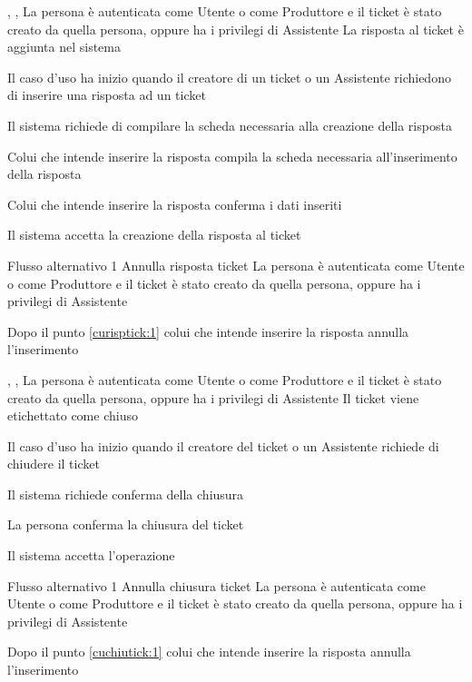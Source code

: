 \tabcuvspace

{, , }
{La persona è autenticata come Utente o come Produttore e il ticket è stato creato da quella persona, oppure ha i privilegi di Assistente}
{La risposta al ticket è aggiunta nel sistema}
{\begin{enumCU}
	\item Il caso d'uso ha inizio quando il creatore di un ticket o un Assistente richiedono di inserire una risposta ad un ticket
	\item Il sistema richiede di compilare la scheda necessaria alla creazione della risposta
	\item Colui che intende inserire la risposta compila la scheda necessaria all'inserimento della risposta\label{curisptick:1}
	\item Colui che intende inserire la risposta conferma i dati inseriti
	\item Il sistema accetta la creazione della risposta al ticket
\end{enumCU}}
%
{Flusso alternativo 1}%
{Annulla risposta ticket}%
{La persona è autenticata come Utente o come Produttore e il ticket è stato creato da quella persona, oppure ha i privilegi di Assistente}%
{\postNulle}%
{\begin{enumCU}
		\item Dopo il punto \ref{curisptick:1} colui che intende inserire la risposta annulla l'inserimento
	\end{enumCU}}%

\tabcuvspace

{, , }
{La persona è autenticata come Utente o come Produttore e il ticket è stato creato da quella persona, oppure ha i privilegi di Assistente}
{Il ticket viene etichettato come chiuso}
{\begin{enumCU}
	\item Il caso d'uso ha inizio quando il creatore del ticket o un Assistente richiede di chiudere il ticket
	\item Il sistema richiede conferma della chiusura \label{cuchiutick:1}
	\item La persona conferma la chiusura del ticket
	\item Il sistema accetta l'operazione
\end{enumCU}}
%
{Flusso alternativo 1}%
{Annulla chiusura ticket}%
{La persona è autenticata come Utente o come Produttore e il ticket è stato creato da quella persona, oppure ha i privilegi di Assistente}%
{\postNulle}%
{\begin{enumCU}
		\item Dopo il punto \ref{cuchiutick:1} colui che intende inserire la risposta annulla l'inserimento
	\end{enumCU}}%

